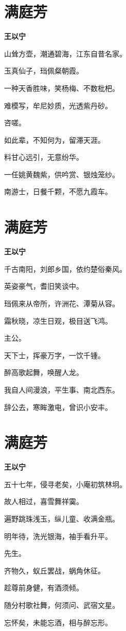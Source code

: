 \documentclass[12pt,a4paper]{ctexbook}
\begin{document}
\section{满庭芳}
\textbf{王以宁}\par\vspace{0.5em}
山耸方壶，潮通碧海，江东自昔名家。\par
玉真仙子，珰佩粲朝霞。\par
一种天香胜味，笑杨梅、不数枇杷。\par
难模写，牟尼妙质，光透紫丹砂。\par
咨嗟。\par
如此辈，不知何为，留滞天涯。\par
料甘心远引，无意纷华。\par
一任姚黄魏紫，供吟赏、银烛笼纱。\par
南游士，日餐千颗，不愿九霞车。\par

\section{满庭芳}
\textbf{王以宁}\par\vspace{0.5em}
千古南阳，刘郎乡国，依约楚俗秦风。\par
英姿豪气，耆旧笑谈中。\par
珰佩来从帝所，许洲花、潭菊从容。\par
霜秋晓，凉生日观，极目送飞鸿。\par
主公。\par
天下士，挥豪万字，一饮千锺。\par
醉高歌起舞，唤醒人龙。\par
我自人间漫浪，平生事、南北西东。\par
辞公去，寒眸激电，曾识小安丰。\par

\section{满庭芳}
\textbf{王以宁}\par\vspace{0.5em}
五十七年，侵寻老矣，小庵初筑林坰。\par
故人相过，喜雪舞祥霙。\par
遍野跳珠浅玉，纵儿童、收满金瓶。\par
明年待，洗光银海，袖手看升平。\par
先生。\par
齐物久，蚁丘罢战，蜗角休征。\par
趁尊前身健，有酒须倾。\par
随分村歌社舞，何须问、武宿文星。\par
忘怀矣，未能忘酒，相与醉忘形。\par
\end{document}
